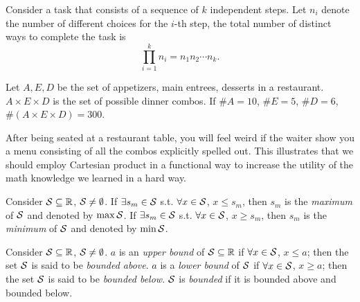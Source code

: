 \begin{axm}
  \label{axm:multiplicationPrinciple}
  Consider a task that consists of a sequence of $k$ independent steps.
  Let $n_i$ denote the number of different choices for the $i$-th step,
   the total number of distinct ways to complete the task
   is 
   \begin{equation}
     \prod_{i=1}^{k} n_i = n_1n_2\cdots n_k.
   \end{equation}
 \end{axm}

 \begin{exm}
   \label{exm:dinnerCombos}
   Let $A, E, D$ be the set of appetizers,
    main entrees, desserts in a restaurant.
   $A\times E\times D$
    is the set of possible dinner combos.
   If $\#A=10$, $\#E=5$, $\#D=6$,
    $\#(A\times E\times D)=300$.
 \end{exm}

 \begin{rem}
   After being seated at a restaurant table,
   you will feel weird if the waiter
   show you a menu consisting of all the combos
   explicitly spelled out.
   This illustrates that we should employ Cartesian product
    in a functional way to increase the utility
    of the math knowledge we learned in a hard way.
 \end{rem}
 
\begin{defn}
  Consider ${\cal S}\subseteq \mathbb{R}$,
   ${\cal S}\ne \emptyset$.
  If $\exists s_m\in{\cal S}$
   s.t. $\forall x\in {\cal S}$, $x\le s_m$,
   then $s_m$ is the \emph{maximum} of ${\cal S}$
   and denoted by $\max {\cal S}$.
  If $\exists s_m\in{\cal S}$
   s.t. $\forall x\in {\cal S}$, $x\ge s_m$,
   then $s_m$ is the \emph{minimum} of ${\cal S}$
   and denoted by $\min {\cal S}$.
\end{defn}

\begin{defn}
  Consider ${\cal S}\subseteq \mathbb{R}$,
   ${\cal S}\ne \emptyset$.
  $a$ is an \emph{upper bound} of ${\cal S}\subseteq \mathbb{R}$
  if $\forall x\in {\cal S}$, $x\le a$;
   then the set ${\cal S}$ is said to be \emph{bounded above}.
  $a$ is a \emph{lower bound} of ${\cal S}$
   if $\forall x\in {\cal S}$, $x\ge a$;
   then the set ${\cal S}$ is said to be \emph{bounded below}.
  ${\cal S}$ is \emph{bounded}
   if it is bounded above and bounded below.
\end{defn}

